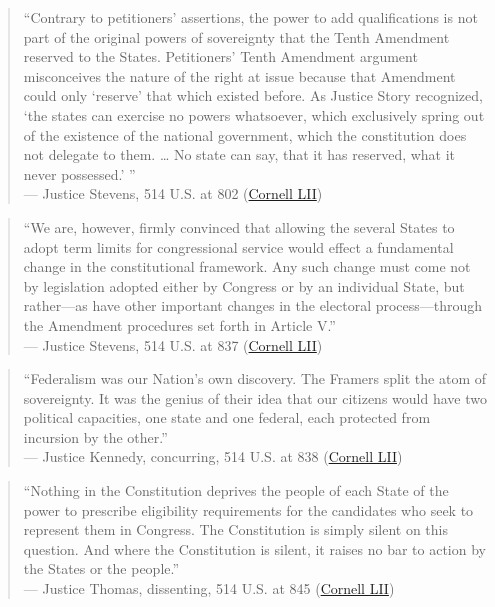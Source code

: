 \documentclass[12pt]{article}
\begin{document}
\begin{quote}
``Contrary to petitioners' assertions, the power to add qualifications is not part of the original powers of sovereignty that the Tenth Amendment reserved to the States. Petitioners' Tenth Amendment argument misconceives the nature of the right at issue because that Amendment could only `reserve' that which existed before. As Justice Story recognized, `the states can exercise no powers whatsoever, which exclusively spring out of the existence of the national government, which the constitution does not delegate to them. \ldots{} No state can say, that it has reserved, what it never possessed.' '' \\
--- Justice Stevens, 514 U.S. at 802 (\href{https://www.law.cornell.edu/supct/html/93-1456.ZO.html}{Cornell LII})
\end{quote}

\begin{quote}
``We are, however, firmly convinced that allowing the several States to adopt term limits for congressional service would effect a fundamental change in the constitutional framework. Any such change must come not by legislation adopted either by Congress or by an individual State, but rather---as have other important changes in the electoral process---through the Amendment procedures set forth in Article V.'' \\
--- Justice Stevens, 514 U.S. at 837 (\href{https://www.law.cornell.edu/supct/html/93-1456.ZO.html}{Cornell LII})
\end{quote}

\begin{quote}
``Federalism was our Nation's own discovery. The Framers split the atom of sovereignty. It was the genius of their idea that our citizens would have two political capacities, one state and one federal, each protected from incursion by the other.'' \\
--- Justice Kennedy, concurring, 514 U.S. at 838 (\href{https://www.law.cornell.edu/supct/html/93-1456.ZC.html}{Cornell LII})
\end{quote}

\begin{quote}
``Nothing in the Constitution deprives the people of each State of the power to prescribe eligibility requirements for the candidates who seek to represent them in Congress. The Constitution is simply silent on this question. And where the Constitution is silent, it raises no bar to action by the States or the people.'' \\
--- Justice Thomas, dissenting, 514 U.S. at 845 (\href{https://www.law.cornell.edu/supct/html/93-1456.ZD.html}{Cornell LII})
\end{quote}
\end{document}
